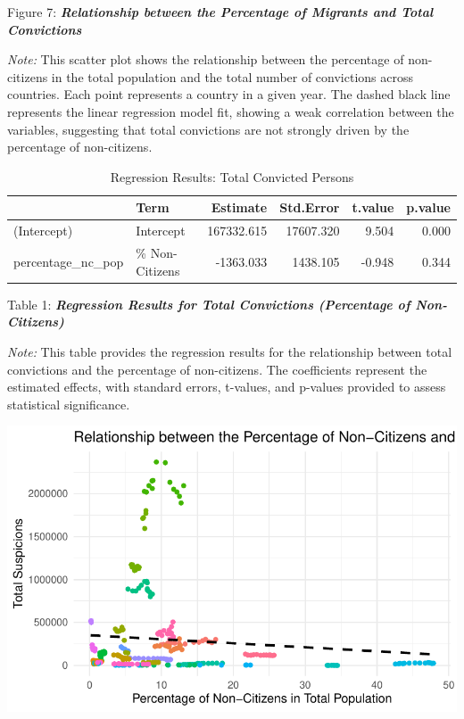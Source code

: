 \documentclass[
]{article}
\begin{document}
Figure 7: \textbf{\emph{Relationship between the Percentage of Migrants
and Total Convictions}}

\emph{Note:} This scatter plot shows the relationship between the
percentage of non-citizens in the total population and the total number
of convictions across countries. Each point represents a country in a
given year. The dashed black line represents the linear regression model
fit, showing a weak correlation between the variables, suggesting that
total convictions are not strongly driven by the percentage of
non-citizens.

\begin{table}
\centering
\caption{Regression Results: Total Convicted Persons}
\centering
\begin{tabular}[t]{l|l|r|r|r|r}
\hline
  & Term & Estimate & Std.Error & t.value & p.value\\
\hline
(Intercept) & Intercept & 167332.615 & 17607.320 & 9.504 & 0.000\\
\hline
percentage\_nc\_pop & \% Non-Citizens & -1363.033 & 1438.105 & -0.948 & 0.344\\
\hline
\end{tabular}
\end{table}

Table 1: \textbf{\emph{Regression Results for Total Convictions
(Percentage of Non-Citizens)}}

\emph{Note:} This table provides the regression results for the
relationship between total convictions and the percentage of
non-citizens. The coefficients represent the estimated effects, with
standard errors, t-values, and p-values provided to assess statistical
significance.

\includegraphics{DataMan_Project_files/figure-pdf/unnamed-chunk-34-1.pdf}
\end{document}
